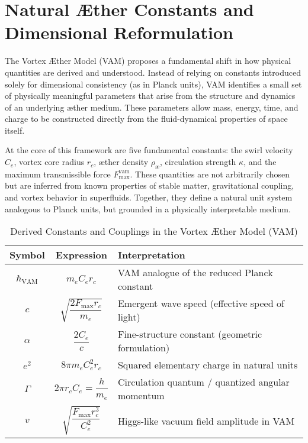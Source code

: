 
\section{ Natural Æther Constants and Dimensional Reformulation}
The Vortex Æther Model (VAM) proposes a fundamental shift in how physical quantities are derived and understood. Instead of relying on constants introduced solely for dimensional consistency (as in Planck units), VAM identifies a small set of physically meaningful parameters that arise from the structure and dynamics of an underlying æther medium. These parameters allow mass, energy, time, and charge to be constructed directly from the fluid-dynamical properties of space itself.

At the core of this framework are five fundamental constants: the swirl velocity $C_e$, vortex core radius $r_c$, æther density $\rho_\text{\ae}$, circulation strength $\kappa$, and the maximum transmissible force $F^{\text{vam}}_\text{max}$. These quantities are not arbitrarily chosen but are inferred from known properties of stable matter, gravitational coupling, and vortex behavior in superfluids. Together, they define a natural unit system analogous to Planck units, but grounded in a physically interpretable medium.

\begin{table}[H]
    \centering
    \begin{tabular}{|c|c|l|}
        \hline
        \textbf{Symbol} & \textbf{Expression} & \textbf{Interpretation} \\
        \hline
        $\hbar_\text{VAM}$ & $m_e C_e r_c$ & VAM analogue of the reduced Planck constant \\
        \hline
        $c$ & $\sqrt{\dfrac{2 F_\text{max} r_c}{m_e}}$ & Emergent wave speed (effective speed of light) \\
        \hline
        $\alpha$ & $\dfrac{2 C_e}{c}$ & Fine-structure constant (geometric formulation) \\
        \hline
        $e^2$ & $8\pi m_e C_e^2 r_c$ & Squared elementary charge in natural units \\
        \hline
        $\Gamma$ & $2\pi r_c C_e = \dfrac{h}{m_e}$ & Circulation quantum / quantized angular momentum \\
        \hline
        $v$ & $\sqrt{\dfrac{F_\text{max} r_c^3}{C_e^2}}$ & Higgs-like vacuum field amplitude in VAM \\
        \hline
    \end{tabular}
    \caption{Derived Constants and Couplings in the Vortex Æther Model (VAM)}
    \label{tab:VAM_constants}
\end{table}

